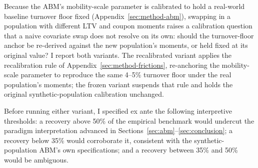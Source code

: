 \documentclass[12pt]{article}
\begin{document}
Because the ABM's mobility-scale parameter is calibrated to hold a real-world baseline turnover floor fixed (Appendix~\ref{sec:method-abm}), swapping in a population with different LTV and coupon moments raises a calibration question that a naive covariate swap does not resolve on its own: should the turnover-floor anchor be re-derived against the new population's moments, or held fixed at its original value? I report both variants. The recalibrated variant applies the recalibration rule of Appendix~\ref{sec:method-frictions}, re-anchoring the mobility-scale parameter to reproduce the same 4--5\% turnover floor under the real population's moments; the frozen variant suspends that rule and holds the original synthetic-population calibration unchanged.

Before running either variant, I specified ex ante the following interpretive thresholds: a recovery above 50\% of the empirical benchmark would undercut the paradigm interpretation advanced in Sections~\ref{sec:abm}--\ref{sec:conclusion}; a recovery below 35\% would corroborate it, consistent with the synthetic-population ABM's own specifications; and a recovery between 35\% and 50\% would be ambiguous.
\end{document}
